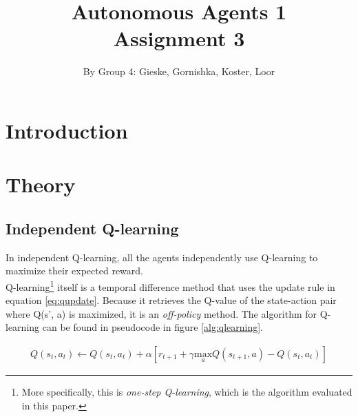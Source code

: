 \documentclass{article}
\begin{document}
\title{Autonomous Agents 1 \\ Assignment 3}

\author{By Group 4: Gieske, Gornishka, Koster, Loor}
\maketitle
\pagebreak
\tableofcontents


\pagebreak

\section{Introduction}


\pagebreak

\section{Theory}

\subsection{Independent Q-learning}
In independent Q-learning, all the agents independently use Q-learning to maximize their expected reward.  \\ 

\noindent Q-learning\footnote{More specifically, this is \textit{one-step Q-learning}, which is the algorithm evaluated in this paper.} itself is a temporal difference method that uses the update rule in equation \ref{eq:qupdate}. Because it retrieves the Q-value of the state-action pair where Q(s', a) is maximized, it is an \textit{off-policy} method. The algorithm for Q-learning can be found in pseudocode in figure \ref{alg:qlearning}.

\begin{mdframed}
\begin{align}
Q(s_t, a_t) \leftarrow Q(s_t,a_t) + \alpha \left[ r_{t+1} + \gamma \underset{a}{\text{max}} Q(s_{t+1},a) - Q(s_t,a_t)\right]\label{eq:qupdate}
\end{align}
\end{mdframed}
\end{document}
